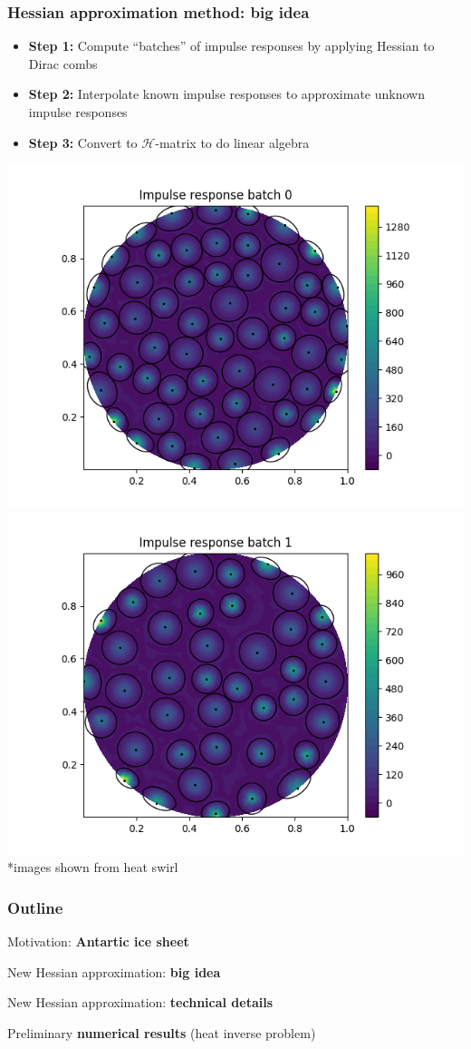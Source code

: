 \documentclass[10pt,final,xcolor=dvipsnames]{beamer}
\begin{document}
\begin{frame}
  \frametitle{Hessian approximation method: big idea}
      \begin{itemize}
      \item {\bf Step 1:} Compute ``batches'' of impulse responses by applying Hessian to Dirac combs
      \item {\bf Step 2:} Interpolate known impulse responses to approximate unknown impulse responses
      \item {\bf Step 3:} Convert to $\mathcal{H}$-matrix to do linear algebra
      \end{itemize}
  	\includegraphics[width=0.45\columnwidth]{IRB1.png}  \includegraphics[width=0.45\columnwidth]{IRB2.png}
  *images shown from heat swirl
\end{frame}
\begin{frame}
	\frametitle{Outline}
	{\Large
		\begin{itemize}
			\setlength\itemsep{2em}
			{\color{lightgray}\item Motivation: \textbf{Antartic ice sheet}}
			{\color{lightgray}\item New Hessian approximation: \textbf{big idea}}
			\item New Hessian approximation: \textbf{technical details}
			{\color{lightgray}\item Preliminary \textbf{numerical results} (heat inverse problem)}
		\end{itemize}
	}
\end{frame}
\end{document}
